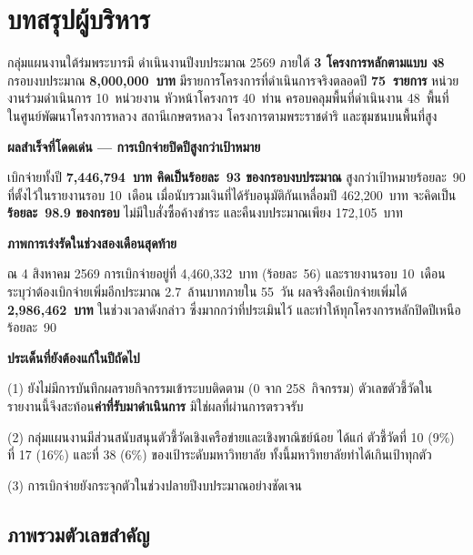 \chapter*{บทสรุปผู้บริหาร}

กลุ่มแผนงานใต้ร่มพระบารมี ดำเนินงานปีงบประมาณ 2569 ภายใต้ \textbf{3 โครงการหลักตามแบบ ง8}
กรอบงบประมาณ \textbf{8,000,000~บาท} มีรายการโครงการที่ดำเนินการจริงตลอดปี \textbf{75~รายการ}
หน่วยงานร่วมดำเนินการ 10~หน่วยงาน หัวหน้าโครงการ 40~ท่าน
ครอบคลุมพื้นที่ดำเนินงาน 48~พื้นที่ ในศูนย์พัฒนาโครงการหลวง สถานีเกษตรหลวง
โครงการตามพระราชดำริ และชุมชนบนพื้นที่สูง

\begin{tipbox}
\textbf{ผลสำเร็จที่โดดเด่น --- การเบิกจ่ายปิดปีสูงกว่าเป้าหมาย}\par
เบิกจ่ายทั้งปี \textbf{7,446,794~บาท คิดเป็นร้อยละ~93 ของกรอบงบประมาณ}
สูงกว่าเป้าหมายร้อยละ~90 ที่ตั้งไว้ในรายงานรอบ 10~เดือน
เมื่อนับรวมเงินที่ได้รับอนุมัติกันเหลื่อมปี 462,200~บาท จะคิดเป็น \textbf{ร้อยละ~98.9 ของกรอบ}
ไม่มีใบสั่งซื้อค้างชำระ และคืนงบประมาณเพียง 172,105~บาท
\end{tipbox}

\begin{infobox}
\textbf{ภาพการเร่งรัดในช่วงสองเดือนสุดท้าย}\par
ณ 4 สิงหาคม 2569 การเบิกจ่ายอยู่ที่ 4,460,332~บาท (ร้อยละ~56) และรายงานรอบ 10~เดือน
ระบุว่าต้องเบิกจ่ายเพิ่มอีกประมาณ 2.7~ล้านบาทภายใน 55~วัน
ผลจริงคือเบิกจ่ายเพิ่มได้ \textbf{2,986,462~บาท} ในช่วงเวลาดังกล่าว
ซึ่งมากกว่าที่ประเมินไว้ และทำให้ทุกโครงการหลักปิดปีเหนือร้อยละ~90
\end{infobox}

\begin{warnbox}
\textbf{ประเด็นที่ยังต้องแก้ในปีถัดไป}\par
(1) ยังไม่มีการบันทึกผลรายกิจกรรมเข้าระบบติดตาม (0 จาก 258~กิจกรรม)
ตัวเลขตัวชี้วัดในรายงานนี้จึงสะท้อน\textbf{ค่าที่รับมาดำเนินการ} มิใช่ผลที่ผ่านการตรวจรับ\par
(2) กลุ่มแผนงานมีส่วนสนับสนุนตัวชี้วัดเชิงเครือข่ายและเชิงพาณิชย์น้อย ได้แก่ ตัวชี้วัดที่ 10 (9\%)
ที่ 17 (16\%) และที่ 38 (6\%) ของเป้าระดับมหาวิทยาลัย ทั้งนี้มหาวิทยาลัยทำได้เกินเป้าทุกตัว\par
(3) การเบิกจ่ายยังกระจุกตัวในช่วงปลายปีงบประมาณอย่างชัดเจน
\end{warnbox}

\section*{ภาพรวมตัวเลขสำคัญ}

